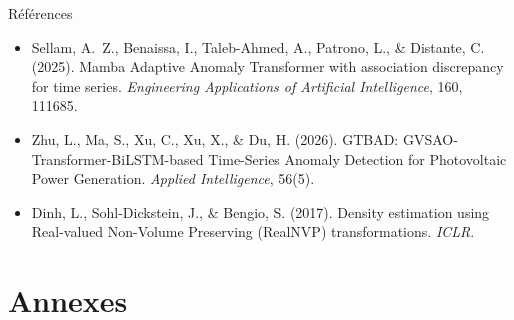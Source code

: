 \documentclass[10pt,aspectratio=169]{beamer}
\begin{document}
\begin{frame}
\end{frame}

\begin{frame}{Références}
  \footnotesize
  \begin{itemize}
    \item Sellam, A.~Z., Benaissa, I., Taleb-Ahmed, A., Patrono, L., \& Distante, C. (2025). Mamba Adaptive Anomaly Transformer with association discrepancy for time series. \textit{Engineering Applications of Artificial Intelligence}, 160, 111685.
    \item Zhu, L., Ma, S., Xu, C., Xu, X., \& Du, H. (2026). GTBAD: GVSAO-Transformer-BiLSTM-based Time-Series Anomaly Detection for Photovoltaic Power Generation. \textit{Applied Intelligence}, 56(5).
    \item Dinh, L., Sohl-Dickstein, J., \& Bengio, S. (2017). Density estimation using Real-valued Non-Volume Preserving (RealNVP) transformations. \textit{ICLR}.
  \end{itemize}
\end{frame}
\appendix
{}
\section{Annexes}
\end{document}
